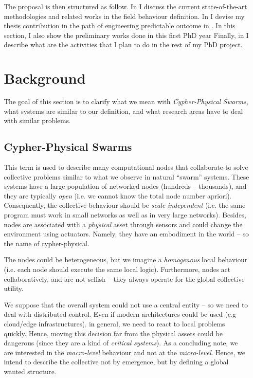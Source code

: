 \documentclass[11pt]{article}
\begin{document}
The proposal is then structured as follow. In  I discuss the current state-of-the-art methodologies and related works in the field \cpsw{} behaviour definition.
%
In  I devise my thesis contribution in the path of engineering predictable outcome in \cpsw{}. In this section, I also show the preliminary works done in this first PhD year
%
Finally, in  I describe what are the activities that I plan to do in the rest of my PhD project.

\section{Background} \label{background}
The goal of this section is to clarify what we mean with \textit{Cypher-Physical Swarms}, what systems are similar to our definition, and what research areas have to deal with similar problems.
\subsection{Cypher-Physical Swarms}
This term is used to describe many computational nodes that collaborate to solve collective problems similar to what we observe in natural ``swarm'' systems.
%
These systems have a large population of networked nodes (hundreds -- thousands), and they are typically \textit{open} (i.e. we cannot know the total node number apriori). Consequently, the collective behaviour should be \textit{scale-independent} (i.e. the same program must work in small networks as well as in very large networks).
%
Besides, nodes are associated with a \textit{physical} asset through sensors and could change the environment using actuators. Namely, they have an embodiment in the world -- so the name of cypher-physical. 

The nodes could be heterogeneous, but we imagine a \emph{homogenous} local behaviour (i.e. each node should execute the same local logic). Furthermore, nodes act collaboratively, and are not selfish -- they always operate for the global collective utility.

We suppose that the overall system could not use a central entity -- so we need to deal with distributed control. Even if modern architectures could be used (e.g cloud/edge infrastructures), in general, we need to react to local problems quickly. Hence, moving this decision far from the physical assets could be dangerous (since they are a kind of \emph{critical systems}).
%
As a concluding note, we are interested in the \textit{macro-level} behaviour and not at the \textit{micro-level}. Hence, we intend to describe the collective not by emergence, but by defining a global wanted structure.
\end{document}

